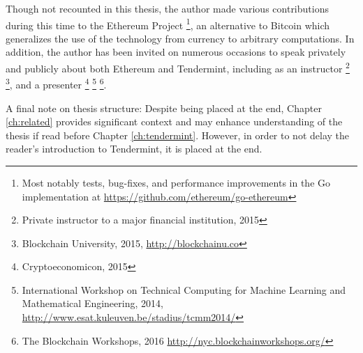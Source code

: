 Though not recounted in this thesis, the author made various contributions during this time to the Ethereum Project%
\footnote{Most notably tests, bug-fixes, and performance improvements in the Go implementation at \url{https://github.com/ethereum/go-ethereum}},
an alternative to Bitcoin which generalizes the use of the technology from currency to arbitrary computations.
In addition, the author has been invited on numerous occasions to speak privately and publicly about both Ethereum and Tendermint,
including as an instructor%
\footnote{Private instructor to a major financial institution, 2015}%
\footnote{Blockchain University, 2015, \url{http://blockchainu.co}}, 
 and a presenter%
\footnote{Cryptoeconomicon, 2015}%
\footnote{International Workshop on Technical Computing for Machine Learning and Mathematical Engineering, 2014, \url{http://www.esat.kuleuven.be/stadius/tcmm2014/}}%
\footnote{The Blockchain Workshops, 2016 \url{http://nyc.blockchainworkshops.org/}}.

A final note on thesis structure: Despite being placed at the end, Chapter \ref{ch:related} provides significant context 
and may enhance understanding of the thesis if read before Chapter \ref{ch:tendermint}. However, in order to not delay the reader's introduction to Tendermint,
it is placed at the end.
